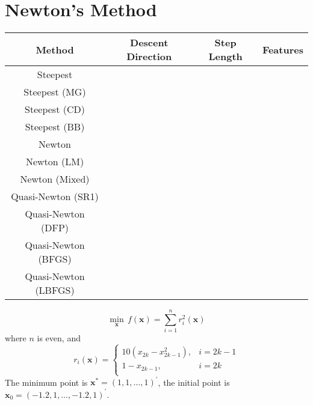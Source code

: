 \section{Newton's Method}

\begin{table}[htbp]
	\centering
	\begin{tabular}{cccc}
		\toprule
		Method & Descent Direction & Step Length & Features \\
		\midrule
		Steepest                                            \\
		Steepest (MG)                                       \\
		Steepest (CD)                                       \\
		Steepest (BB)                                       \\
		\midrule
		Newton                                              \\
		Newton (LM)                                         \\
		Newton (Mixed)                                      \\
		\midrule
		Quasi-Newton (SR1)                                  \\
		Quasi-Newton (DFP)                                  \\
		Quasi-Newton (BFGS)                                 \\
		Quasi-Newton (LBFGS)                                \\
		\bottomrule
	\end{tabular}
\end{table}

\begin{example}
	\begin{equation}
		\min_{\mathbf{x}}\,f(\mathbf{x})=\sum_{i=1}^{n}r_{i}^{2}(\mathbf{x})
	\end{equation}
	where $n$ is even, and
	\begin{equation}
		r_{i}(\mathbf{x})=\begin{cases}
			10(x_{2k}-x_{2k-1}^{2}), & i=2k-1 \\
			1-x_{2k-1},              & i=2k   \\
		\end{cases}
	\end{equation}
	The minimum point is $\mathbf{x}^{*}=(1,1,\ldots,1)^{\prime}$, the initial point is $\mathbf{x}_{0}=(-1.2,1,\ldots,-1.2,1)^{\prime}$.
\end{example}
